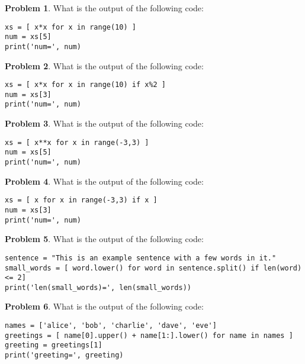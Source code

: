 \documentclass[10pt]{article}
\theoremstyle{definition}
\newtheorem{problem}{Problem}
\begin{document}
\begin{problem}
    What is the output of the following code:
\end{problem}
\begin{lstlisting}
xs = [ x*x for x in range(10) ]
num = xs[5]
print('num=', num)
\end{lstlisting}
\vspace{2.5in}

\begin{problem}
    What is the output of the following code:
\end{problem}
\begin{lstlisting}
xs = [ x*x for x in range(10) if x%2 ]
num = xs[3]
print('num=', num)
\end{lstlisting}
\vspace{2.5in}

\begin{problem}
    What is the output of the following code:
\end{problem}
\begin{lstlisting}
xs = [ x**x for x in range(-3,3) ]
num = xs[5]
print('num=', num)
\end{lstlisting}
\vspace{1.5in}

\begin{problem}
    What is the output of the following code:
\end{problem}
\begin{lstlisting}
xs = [ x for x in range(-3,3) if x ]
num = xs[3]
print('num=', num)
\end{lstlisting}
\vspace{1.2in}


\begin{problem}
    What is the output of the following code:
\end{problem}
\begin{lstlisting}
sentence = "This is an example sentence with a few words in it."
small_words = [ word.lower() for word in sentence.split() if len(word) <= 2]
print('len(small_words)=', len(small_words))
\end{lstlisting}
\vspace{1.5in}

\begin{problem}
    What is the output of the following code:
\end{problem}
\begin{lstlisting}
names = ['alice', 'bob', 'charlie', 'dave', 'eve']
greetings = [ name[0].upper() + name[1:].lower() for name in names ]
greeting = greetings[1]
print('greeting=', greeting)
\end{lstlisting}
\vspace{1.5in}
\end{document}
